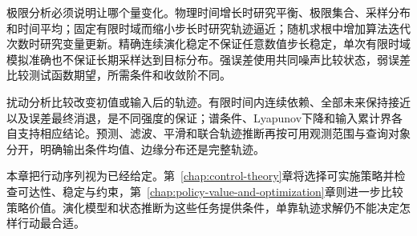 极限分析必须说明让哪个量变化。物理时间增长时研究平衡、极限集合、采样分布和时间平均；固定有限时域而缩小步长时研究轨迹逼近；随机求根中增加算法迭代次数时研究变量更新。精确连续演化稳定不保证任意数值步长稳定，单次有限时域模拟准确也不保证长期采样达到目标分布。强误差使用共同噪声比较状态，弱误差比较测试函数期望，所需条件和收敛阶不同。

扰动分析比较改变初值或输入后的轨迹。有限时间内连续依赖、全部未来保持接近以及误差最终消退，是不同强度的保证；谱条件、Lyapunov下降和输入累计界各自支持相应结论。预测、滤波、平滑和联合轨迹推断再按可用观测范围与查询对象分开，明确输出条件均值、边缘分布还是完整轨迹。

本章把行动序列视为已经给定。第~\ref{chap:control-theory}章将选择可实施策略并检查可达性、稳定与约束，第~\ref{chap:policy-value-and-optimization}章则进一步比较策略价值。演化模型和状态推断为这些任务提供条件，单靠轨迹求解仍不能决定怎样行动最合适。
